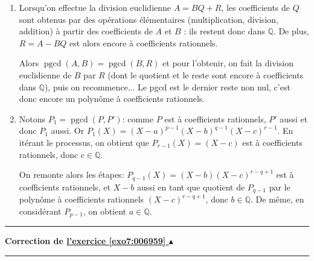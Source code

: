 \documentclass[11pt,a4paper]{article}
\newcommand{\Qq}{\mathbb{Q}} \newcommand{\Q}{\mathbb{Q}}
\newcommand{\pgcd}{\mathop{\mathrm{pgcd}}\nolimits}
\newcounter{exo}
\newcommand{\correction}[1]{\hypertarget{cor7:#1}{}\label{cor7:#1}{\bf Correction de \hyperlink{exo7:#1}{l'exercice \ref{exo7:#1} $\blacktriangle$}}\vspace{1mm}\hrule\vspace{1mm}}
\newcommand{\fincorrection}{\vspace{1mm}\hrule\vspace*{7mm}}
\begin{document}
\begin{enumerate}
\item Lorsqu'on effectue la division euclidienne $A=BQ+R$, 
les coefficients de $Q$ sont obtenus par des opérations 
élémentaires (multiplication, division, addition) à partir 
des coefficients de $A$ et $B$ : ils restent donc dans $\Qq$. 
De plus, $R=A-BQ$ est alors encore à coefficients rationnels. 

Alors $\pgcd(A,B)=\pgcd(B,R)$ et pour l'obtenir, on fait 
la division euclidienne de $B$ par $R$ (dont le quotient 
et le reste sont encore à coefficients dans $\Qq$), puis on 
recommence... Le pgcd est le dernier reste non nul, c'est 
donc encore un polynôme à coefficients rationnels.

\item Notons $P_1=\pgcd(P,P')$: comme $P$ est à coefficients 
rationnels, $P'$ aussi et donc $P_1$ aussi. 
Or $P_1(X)=(X-a)^{p-1}(X-b)^{q-1}(X-c)^{r-1}$. En itérant 
le processus, on obtient que $P_{r-1}(X)=(X-c)$ est à 
coefficients rationnels, donc $c\in\Qq$.

On remonte alors les étapes: $P_{q-1}(X)=(X-b)(X-c)^{r-q+1}$ 
est à coefficients rationnels, et $X-b$ aussi en tant que 
quotient de $P_{q-1}$ par le polynôme à coefficients rationnels 
$(X-c)^{r-q+1}$, donc $b\in\Qq$. De même, en considérant 
$P_{p-1}$, on obtient $a\in\Qq$.
\end{enumerate}
\fincorrection\correction{006959}
\
\end{document}
